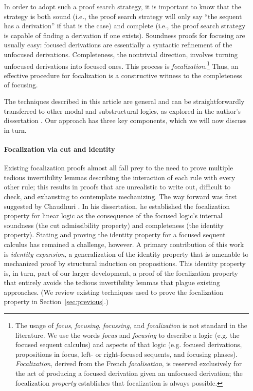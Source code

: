 \documentclass[acmtocl]{robtrans}\pdfoutput=1
\begin{document}
In order to adopt such a proof search strategy, it is important to
know that the strategy is both sound (i.e., the proof search strategy
will only say ``the sequent has a derivation'' if that is the case)
and complete (i.e., the proof search strategy is capable of finding a
derivation if one exists). Soundness proofs for focusing are usually easy:
focused derivations are essentially a syntactic refinement of the
unfocused derivations.  Completeness, the nontrivial direction,
involves turning unfocused derivations into focused ones. This process
is {\it focalization}.\footnote{The usage of {\it focus}, {\it
    focusing}, {\it focussing}, and {\it focalization} is not standard
  in the literature. We use the words {\it
    focus} and {\it focusing} to describe a logic (e.g. the focused
  sequent calculus) and aspects of that logic (e.g. focused
  derivations, propositions in focus, left- or right-focused sequents,
  and focusing phases).  {\it Focalization}, derived from the French
  {\it focalisation}, is reserved exclusively for the act of producing
  a focused derivation given an unfocused derivation; the focalization
  {\it property} establishes that focalization is always possible.} Thus, an effective procedure for
focalization is a constructive witness to the completeness of
focusing.

The techniques described in this article are general and can be
straightforwardly transferred to other modal and substructural logics,
as explored in the author's dissertation
\cite{simmons12substructural}. Our approach has three key
components, which we will now discuss in turn.

\paragraph*{Focalization via cut and identity}
Existing focalization proofs almost all fall prey to the need to prove
multiple tedious invertibility lemmas describing the interaction of
each rule with every other rule; this results in proofs that are
unrealistic to write out, difficult to check, and exhausting to
contemplate mechanizing. The way forward was first suggested by
Chaudhuri . In his dissertation, he
established the focalization property for linear logic as the
consequence of the focused logic's internal soundness (the cut
admissibility property) and completeness (the identity property).
Stating and proving the identity property for a focused sequent
calculus has remained a challenge, however. A primary contribution of
this work is {\it identity expansion}, a generalization of the
identity property that is amenable to mechanized proof by structural
induction on propositions. This identity property is, in turn, part of
our larger development, a proof of the focalization property that
entirely avoids the tedious invertibility lemmas that plague existing
approaches.  (We review existing techniques used to prove the
focalization property in Section~\ref{sec:previous}.)
\end{document}
